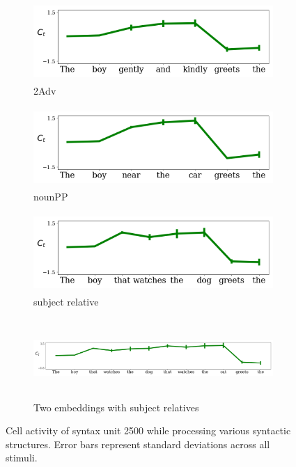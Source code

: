 \begin{figure}[t]
    \begin{subfigure}{0.32\textwidth}
            \centering
            \includegraphics[width=\linewidth, height=3cm]{Figures/adv_conjunction_1149_cell}
            \caption{2Adv}
            \label{fig:syntax-unit-2Adv}
    \end{subfigure}
    \begin{subfigure}{0.32\textwidth}
            \centering
            \includegraphics[width=\linewidth, height=3cm]{Figures/nounpp_1149_cell.png}
            \caption{nounPP}
            \label{fig:syntax-unit-nounpp}
    \end{subfigure}
    \begin{subfigure}{0.32\textwidth}
            \centering
            \includegraphics[width=\linewidth, height=3cm]{Figures/subjrel_that_1149_cell.png}
            \caption{subject relative}
            \label{fig:syntax-unit-subjrel}
    \end{subfigure}
    \begin{subfigure}{\textwidth}
            \centering
            \includegraphics[width=\linewidth, height=3cm]{Figures/double_subjrel_that_1149_cell.png}
            \caption{Two embeddings with subject relatives}
            \label{fig:syntax-unit-double-subjrel}
    \end{subfigure}
\caption{Cell activity of syntax unit \unit{2}{500} while processing various syntactic structures. Error bars represent standard deviations across all stimuli. }
\end{figure}

